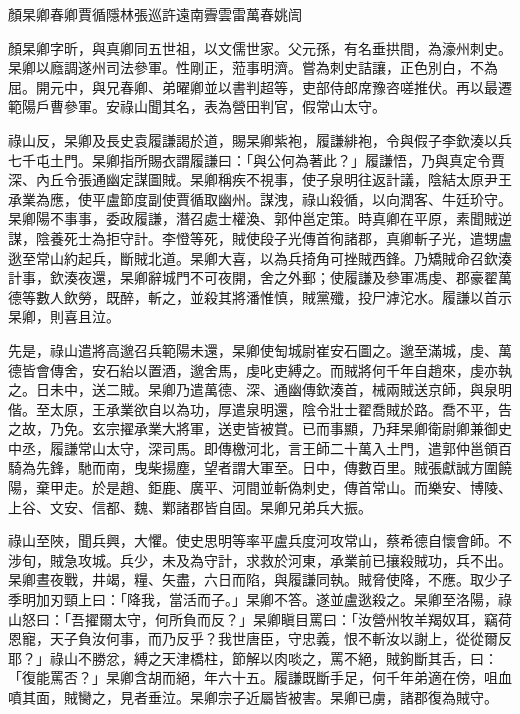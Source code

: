 
\begin{pinyinscope}

 顏杲卿春卿賈循隱林張巡許遠南霽雲雷萬春姚訚



 顏杲卿字昕，與真卿同五世祖，以文儒世家。父元孫，有名垂拱間，為濠州刺史。杲卿以廕調遂州司法參軍。性剛正，蒞事明濟。嘗為刺史詰讓，正色別白，不為屈。開元中，與兄春卿、弟曜卿並以書判超等，吏部侍郎席豫咨嗟推伏。再以最遷範陽戶曹參軍。安祿山聞其名，表為營田判官，假常山太守。



 祿山反，杲卿及長史袁履謙謁於道，賜杲卿紫袍，履謙緋袍，令與假子李欽湊以兵七千屯土門。杲卿指所賜衣謂履謙曰：「與公何為著此？」履謙悟，乃與真定令賈深、內丘令張通幽定謀圖賊。杲卿稱疾不視事，使子泉明往返計議，陰結太原尹王承業為應，使平盧節度副使賈循取幽州。謀洩，祿山殺循，以向潤客、牛廷玠守。杲卿陽不事事，委政履謙，潛召處士權渙、郭仲邕定策。時真卿在平原，素聞賊逆謀，陰養死士為拒守計。李憕等死，賊使段子光傳首徇諸郡，真卿斬子光，遣甥盧逖至常山約起兵，斷賊北道。杲卿大喜，以為兵掎角可挫賊西鋒。乃矯賊命召欽湊計事，欽湊夜還，杲卿辭城門不可夜開，舍之外郵；使履謙及參軍馮虔、郡豪翟萬德等數人飲勞，既醉，斬之，並殺其將潘惟慎，賊黨殲，投尸滹沱水。履謙以首示杲卿，則喜且泣。



 先是，祿山遣將高邈召兵範陽未還，杲卿使匋城尉崔安石圖之。邈至滿城，虔、萬德皆會傳舍，安石紿以置酒，邈舍馬，虔叱吏縛之。而賊將何千年自趙來，虔亦執之。日未中，送二賊。杲卿乃遣萬德、深、通幽傳欽湊首，械兩賊送京師，與泉明偕。至太原，王承業欲自以為功，厚遣泉明還，陰令壯士翟喬賊於路。喬不平，告之故，乃免。玄宗擢承業大將軍，送吏皆被賞。已而事顯，乃拜杲卿衛尉卿兼御史中丞，履謙常山太守，深司馬。即傳檄河北，言王師二十萬入土門，遣郭仲邕領百騎為先鋒，馳而南，曳柴揚塵，望者謂大軍至。日中，傳數百里。賊張獻誠方圍饒陽，棄甲走。於是趙、鉅鹿、廣平、河間並斬偽刺史，傳首常山。而樂安、博陵、上谷、文安、信都、魏、鄴諸郡皆自固。杲卿兄弟兵大振。



 祿山至陜，聞兵興，大懼。使史思明等率平盧兵度河攻常山，蔡希德自懷會師。不涉旬，賊急攻城。兵少，未及為守計，求救於河東，承業前已攘殺賊功，兵不出。杲卿晝夜戰，井竭，糧、矢盡，六日而陷，與履謙同執。賊脅使降，不應。取少子季明加刃頸上曰：「降我，當活而子。」杲卿不答。遂並盧逖殺之。杲卿至洛陽，祿山怒曰：「吾擢爾太守，何所負而反？」杲卿瞋目罵曰：「汝營州牧羊羯奴耳，竊荷恩寵，天子負汝何事，而乃反乎？我世唐臣，守忠義，恨不斬汝以謝上，從從爾反耶？」祿山不勝忿，縛之天津橋柱，節解以肉啖之，罵不絕，賊鉤斷其舌，曰：「復能罵否？」杲卿含胡而絕，年六十五。履謙既斷手足，何千年弟適在傍，咀血噴其面，賊臠之，見者垂泣。杲卿宗子近屬皆被害。杲卿已虜，諸郡復為賊守。




\end{pinyinscope}
